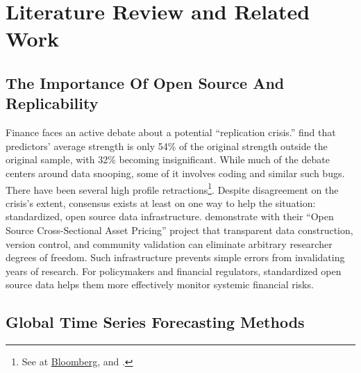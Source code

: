 \documentclass{article}
\begin{document}
\section{Literature Review and Related Work}
\label{sec:literature}


\subsection{The Importance Of Open Source And Replicability}

Finance faces an active debate about a potential ``replication crisis.'' \cite{Jensen2023} find that predictors' average strength is only 54\% of the original strength outside the original sample, with 32\% becoming insignificant. While much of the debate centers around data snooping, some of it involves
coding and similar such bugs. There have been several high profile retractions\footnote{See  \cite{Lee2023} at \href{https://www.bloomberg.com/news/articles/2023-12-01/a-grad-school-number-cruncher-shakes-up-the-world-of-bond-quants}{Bloomberg}, and \cite{Dickerson2024}.}.
Despite disagreement on the crisis's extent, consensus exists at least on one way to help the situation: standardized, open source data infrastructure. \cite{Chen2022} demonstrate with their ``Open Source Cross-Sectional Asset Pricing'' project that transparent data construction, version control, and community validation can eliminate arbitrary researcher degrees of freedom. Such infrastructure prevents simple errors from invalidating years of research. For policymakers and financial regulators, standardized open source data 
helps them more effectively monitor systemic financial risks.

\subsection{Global Time Series Forecasting Methods}
\end{document}
